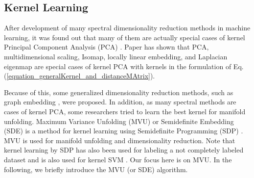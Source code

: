 \documentclass[lang=cn,10pt]{gorgeousnbook}
\numberwithin{equation}{section}%
\numberwithin{figure}{section}%
\begin{document}
\subsection{Kernel Learning}\label{section_kernel_learning}

After development of many spectral dimensionality reduction methods in machine learning, it was found out that many of them are actually special cases of kernel Principal Component Analysis (PCA) \cite{bengio2003spectral,bengio2004learning}. 
Paper \cite{ham2004kernel} has shown that PCA, multidimensional scaling, Isomap, locally linear embedding, and Laplacian eigenmap are special cases of kernel PCA with kernels in the formulation of Eq. (\ref{equation_generalKernel_and_distanceMAtrix}).

Because of this, some generalized dimensionality reduction methods, such as graph embedding \cite{yan2005graph}, were proposed.
In addition, as many spectral methods are cases of kernel PCA, some researchers tried to learn the best kernel for manifold unfolding. 
Maximum Variance Unfolding (MVU) or Semidefinite Embedding (SDE) \cite{weinberger2005nonlinear,weinberger2006unsupervised,weinberger2006introduction} is a method for kernel learning using Semidefinite Programming (SDP) \cite{vandenberghe1996semidefinite}. MVU is used for manifold unfolding and dimensionality reduction.
Note that kernel learning by SDP has also been used for labeling a not completely labeled dataset and is also used for kernel SVM \cite{lanckriet2004learning,karimi2017summary}. Our focus here is on MVU. 
In the following, we briefly introduce the MVU (or SDE) algorithm. 
\end{document}
